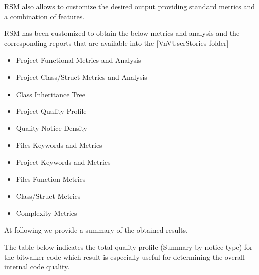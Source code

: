 RSM also allows to customize the desired output providing standard metrics and a combination of features.

RSM has been customized to obtain the below metrics and analysis and the corresponding reports that are available into the \href{https://github.com/openETCS/validation/tree/master/VnVUserStories/VnVUserStorySQS/04-Results}{[VnVUserStories folder]}

\begin{itemize}
\item Project Functional Metrics and Analysis
\item Project Class/Struct Metrics and Analysis
\item Class Inheritance Tree
\item Project Quality Profile
\item Quality Notice Density
\item Files Keywords and Metrics
\item Project Keywords and Metrics
\item Files Function Metrics
\item Class/Struct Metrics
\item Complexity Metrics
\end{itemize}

At following we provide a summary of the obtained results.

The table below indicates the total quality profile (Summary by notice type) for the bitwalker code which result is especially useful for determining the overall internal code quality.
         
